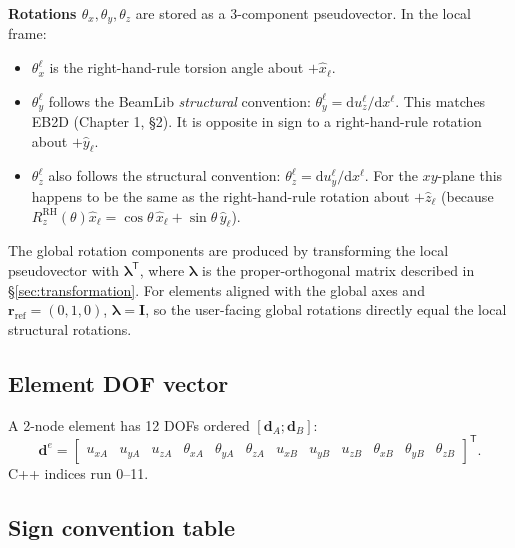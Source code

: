 \documentclass[11pt,a4paper]{article}
\newcommand{\dd}{\mathrm{d}}
\newcommand{\bmath}[1]{\boldsymbol{#1}}
\begin{document}
\textbf{Rotations $\theta_x, \theta_y, \theta_z$} are stored as a 3-component pseudovector. In the local frame:
\begin{itemize}
    \item $\theta_x^\ell$ is the right-hand-rule torsion angle about $+\hat{x}_\ell$.
    \item $\theta_y^\ell$ follows the BeamLib \emph{structural} convention: $\theta_y^\ell = \dd u_z^\ell/\dd x^\ell$. This matches EB2D (Chapter 1, \S2). It is opposite in sign to a right-hand-rule rotation about $+\hat{y}_\ell$.
    \item $\theta_z^\ell$ also follows the structural convention: $\theta_z^\ell = \dd u_y^\ell/\dd x^\ell$. For the $xy$-plane this happens to be the same as the right-hand-rule rotation about $+\hat{z}_\ell$ (because $R_z^{\mathrm{RH}}(\theta)\hat{x}_\ell = \cos\theta\,\hat{x}_\ell + \sin\theta\,\hat{y}_\ell$).
\end{itemize}
The global rotation components are produced by transforming the local pseudovector with $\bmath{\lambda}^\mathsf{T}$, where $\bmath{\lambda}$ is the proper-orthogonal matrix described in \S\ref{sec:transformation}. For elements aligned with the global axes and $\bmath{r}_{\text{ref}} = (0,1,0)$, $\bmath{\lambda} = \bmath{I}$, so the user-facing global rotations directly equal the local structural rotations.

\subsection{Element DOF vector}

A 2-node element has 12 DOFs ordered $[\bmath{d}_A; \bmath{d}_B]$:
\[
\bmath{d}^e = \begin{bmatrix} u_{xA} & u_{yA} & u_{zA} & \theta_{xA} & \theta_{yA} & \theta_{zA} & u_{xB} & u_{yB} & u_{zB} & \theta_{xB} & \theta_{yB} & \theta_{zB} \end{bmatrix}^\mathsf{T}.
\]
C++ indices run 0--11.

\subsection{Sign convention table}
\end{document}

